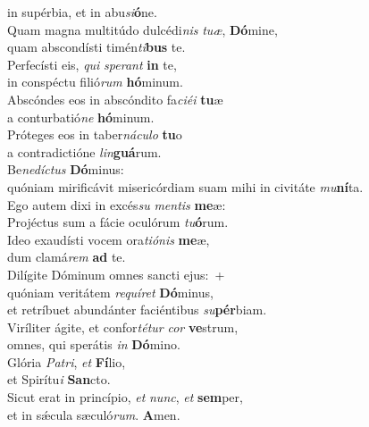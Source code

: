 \evenverse in supérbia, et in abu\textit{si}\textbf{ó}ne.\\
\oddverse Quam magna multitúdo dulcédi\textit{nis} \textit{tu}\textit{æ}, \textbf{Dó}mine,~\*\\
\oddverse quam abscondísti timén\textit{ti}\textbf{bus} te.\\
\evenverse Perfecísti eis, \textit{qui} \textit{spe}\textit{rant} \textbf{in} te,~\*\\
\evenverse in conspéctu filió\textit{rum} \textbf{hó}minum.\\
\oddverse Abscóndes eos in abscóndito fa\textit{ci}\textit{é}\textit{i} \textbf{tu}æ~\*\\
\oddverse a conturbatió\textit{ne} \textbf{hó}minum.\\
\evenverse Próteges eos in taber\textit{ná}\textit{cu}\textit{lo} \textbf{tu}o~\*\\
\evenverse a contradictióne \textit{lin}\textbf{guá}rum.\\
\oddverse Be\textit{ne}\textit{dí}\textit{ctus} \textbf{Dó}minus:~\*\\
\oddverse quóniam mirificávit misericórdiam suam mihi in civitáte \textit{mu}\textbf{ní}ta.\\
\evenverse Ego autem dixi in excés\textit{su} \textit{men}\textit{tis} \textbf{me}æ:~\*\\
\evenverse Projéctus sum a fácie oculórum \textit{tu}\textbf{ó}rum.\\
\oddverse Ideo exaudísti vocem ora\textit{ti}\textit{ó}\textit{nis} \textbf{me}æ,~\*\\
\oddverse dum clamá\textit{rem} \textbf{ad} te.\\
\evenverse Dilígite Dóminum omnes sancti ejus:~+\\
\evenverse  quóniam veritátem \textit{re}\textit{quí}\textit{ret} \textbf{Dó}minus,~\*\\
\evenverse et retríbuet abundánter faciéntibus \textit{su}\textbf{pér}biam.\\
\oddverse Viríliter ágite, et confor\textit{té}\textit{tur} \textit{cor} \textbf{ve}strum,~\*\\
\oddverse omnes, qui sperátis \textit{in} \textbf{Dó}mino.\\
\evenverse Glória \textit{Pa}\textit{tri}, \textit{et} \textbf{Fí}lio,~\*\\
\evenverse et Spirítu\textit{i} \textbf{San}cto.\\
\oddverse Sicut erat in princípio, \textit{et} \textit{nunc}, \textit{et} \textbf{sem}per,~\*\\
\oddverse et in sǽcula sæculó\textit{rum}. \textbf{A}men.\\
